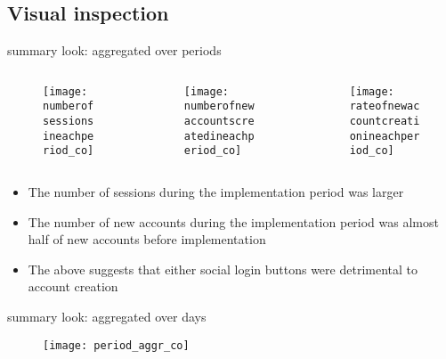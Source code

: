 \documentclass{beamer}
\begin{document}
		\subsection{Visual inspection}
		\begin{frame}{summary look: aggregated over periods}	
			\begin{columns}[onlytextwidth]
				\begin{column}{0.3\textwidth}
					\begin{figure}[H]
						\centering
						\texttt{[image: numberofsessionsineachperiod\_co]}
					\end{figure}
				\end{column}
				
				\begin{column}{.3\textwidth}
					\begin{figure}[H]
						\centering
						\texttt{[image: numberofnewaccountscreatedineachperiod\_co]}
					\end{figure}
				\end{column}
				
				\begin{column}{0.3\textwidth}
					\begin{figure}[H]
						\centering
						\texttt{[image: rateofnewaccountcreationineachperiod\_co]}
					\end{figure}
				\end{column}
			\end{columns}
		\end{frame}
		
		\begin{frame}
			\begin{itemize}
				\item The number of sessions during the implementation period was larger
				\item The number of new accounts during the implementation period was almost half of new accounts before implementation
				\item The above suggests that either social login buttons were detrimental to account creation
			\end{itemize}
		\end{frame}
		
		\begin{frame}{summary look: aggregated over days}
			\begin{figure}[H]
				\centering
				\texttt{[image: period\_aggr\_co]}
			\end{figure}
		\end{frame}
		
\end{document}
